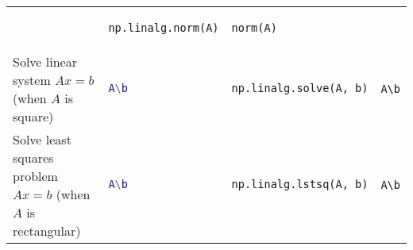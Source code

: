 \begin{tabular}[]{@{}llll@{}}
\begin{minipage}[t]{0.22\columnwidth}
\end{minipage} & \begin{minipage}[t]{0.23\columnwidth}\raggedright
\begin{lstlisting}[language=Python]
np.linalg.norm(A)
\end{lstlisting}

\end{minipage} & \begin{minipage}[t]{0.20\columnwidth}\raggedright
\begin{lstlisting}
norm(A)
\end{lstlisting}

\end{minipage}\tabularnewline
\begin{minipage}[t]{0.23\columnwidth}\raggedright
Solve linear system \(Ax=b\) (when \(A\) is square)
\end{minipage} & \begin{minipage}[t]{0.22\columnwidth}\raggedright
\begin{lstlisting}[language=Matlab]
A\b
\end{lstlisting}

\end{minipage} & \begin{minipage}[t]{0.23\columnwidth}\raggedright
\begin{lstlisting}[language=Python]
np.linalg.solve(A, b)
\end{lstlisting}

\end{minipage} & \begin{minipage}[t]{0.20\columnwidth}\raggedright
\begin{lstlisting}
A\b
\end{lstlisting}

\end{minipage}\tabularnewline
\begin{minipage}[t]{0.23\columnwidth}\raggedright
Solve least squares problem \(Ax=b\) (when \(A\) is rectangular)
\end{minipage} & \begin{minipage}[t]{0.22\columnwidth}\raggedright
\begin{lstlisting}[language=Matlab]
A\b
\end{lstlisting}

\end{minipage} & \begin{minipage}[t]{0.23\columnwidth}\raggedright
\begin{lstlisting}[language=Python]
np.linalg.lstsq(A, b)
\end{lstlisting}

\end{minipage} & \begin{minipage}[t]{0.20\columnwidth}\raggedright
\begin{lstlisting}
A\b
\end{lstlisting}

\end{minipage}\tabularnewline
\bottomrule
\end{tabular}

